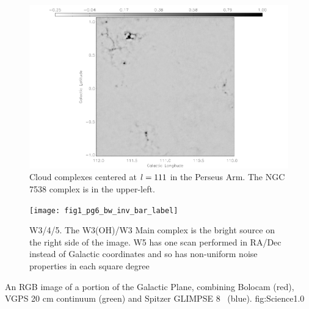 \addtocounter{figure}{-1}
\addtocounter{subfig}{1}

\begin{figure}
\hspace{-0.5in}
  \includegraphics[scale=0.8]{fig1_pg4_bw_inv_bar_label} 
  \caption{Cloud complexes centered at $l=111$ in the Perseus Arm. 
  The NGC 7538 complex is in the upper-left.}
\end{figure}

\addtocounter{figure}{-1}
\addtocounter{subfig}{1}

\begin{figure}
  \hspace{-1in}
  \texttt{[image: fig1\_pg6\_bw\_inv\_bar\_label]} 
  \caption{W3/4/5.  The W3(OH)/W3 Main complex is the bright source
  on the right side of the image.  W5 has one scan performed in RA/Dec
  instead of Galactic coordinates and so has non-uniform noise properties
  in each square degree}
\end{figure}

\renewcommand{\thefigure}{\arabic{figure}}

\clearpage

{An RGB image of a portion of the Galactic Plane, combining Bolocam
(red), VGPS 20 cm continuum (green) and Spitzer GLIMPSE 8 \mum\
(blue).}  {fig:Science}{1.0}

\clearpage



